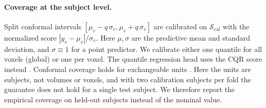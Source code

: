 \paragraph{Coverage at the subject level.} Split conformal intervals $[\mu_v - q\,\sigma_v, \mu_v + q\,\sigma_v]$ are calibrated on $\mathcal{S}_{\mathrm{cal}}$ with the normalized score $|y_v-\mu_v|/\sigma_v$. Here $\mu,\sigma$ are the predictive mean and standard deviation, and $\sigma\equiv 1$ for a point predictor. We calibrate either one quantile for all voxels (global) or one per voxel. The quantile regression head uses the CQR score instead \citep{romano2019conformalized}. Conformal coverage holds for exchangeable units \citep{lei2018distribution}. Here the units are subjects, not volumes or voxels, and with two calibration subjects per fold the guarantee does not hold for a single test subject. We therefore report the empirical coverage on held-out subjects instead of the nominal value.
